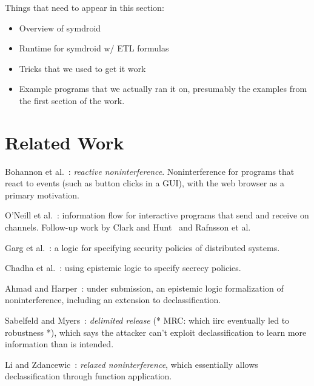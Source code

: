\documentclass{sig-alternate}
\theoremstyle{definition}
\begin{document}
{Things that need to appear in this section:

\begin{itemize}
\item Overview of symdroid

\item Runtime for symdroid w/ ETL formulas

\item Tricks that we used to get it work

\item Example programs that we actually ran it on, presumably the
  examples from the first section of the work.
\end{itemize}

\section{Related Work}
\label{sec:related-work}


Bohannon et al.~\cite{Bohannon:09}: \emph{reactive noninterference}.
Noninterference for programs that react to events (such as button clicks in a GUI), 
with the web browser as a primary motivation. 

O'Neill et al.~\cite{O'Neill:06}: information flow for interactive programs that
send and receive on channels. 
Follow-up work by Clark and Hunt~\cite{Clark:09} and Rafnsson et al.~\cite{Rafnsson:12}

Garg et al.~\cite{Garg:06}: a logic for specifying security policies of distributed systems.

Chadha et al.~\cite{Lee:09}: using epistemic logic to specify secrecy policies.

Ahmad and Harper~\cite{Ahmad:13}: under submission, an epistemic logic formalization of 
noninterference, including an extension to declassification.

Sabelfeld and Myers~\cite{Sabelfeld:04}: \emph{delimited release} (* MRC: which iirc eventually led to robustness *), which says the attacker can't exploit declassification to learn more information than is intended.

Li and Zdancewic~\cite{Li:05}: \emph{relaxed noninterference}, which essentially allows declassification through function application.

}
\end{document}
